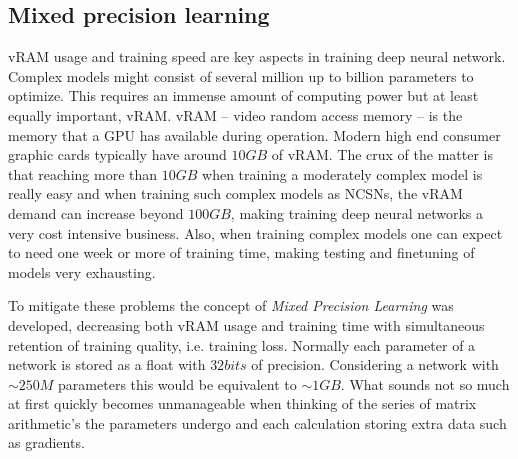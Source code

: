 \subsection{Mixed precision learning} \label{sec:5.3.1}
vRAM usage and training speed are key aspects in training deep neural network. Complex models might consist of several million up to billion parameters to optimize. This requires an immense amount of computing power but at least equally important, vRAM. vRAM – video random access memory – is the memory that a GPU has available during operation. Modern high end consumer graphic cards typically have around $10GB$ of vRAM. The crux of the matter is that reaching more than $10GB$ when training a moderately complex model is really easy and when training such complex models as NCSNs, the vRAM demand can increase beyond $100GB$, making training deep neural networks a very cost intensive business. Also, when training complex models one can expect to need one week or more of training time, making testing and finetuning of models very exhausting.

To mitigate these problems the concept of \textit{Mixed Precision Learning} \cite{mixed_prec} was developed, decreasing both vRAM usage and training time with simultaneous retention of training quality, i.e. training loss. Normally each parameter of a network is stored as a float with $32bits$ of precision. Considering a network with $\sim250M$ parameters this would be equivalent to $\sim1GB$. What sounds not so much at first quickly becomes unmanageable when thinking of the series of matrix arithmetic's the parameters undergo and each calculation storing extra data such as gradients. 

